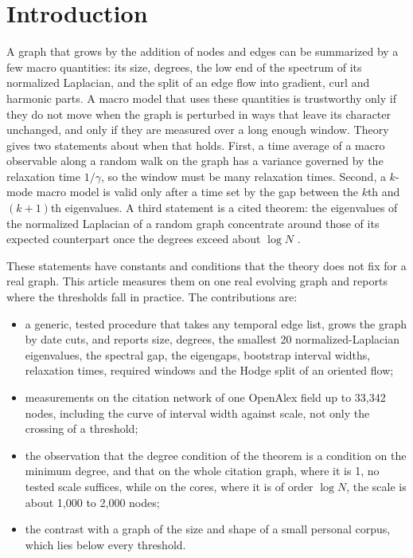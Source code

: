 \documentclass[11pt]{article}
\begin{document}
\section{Introduction}
A graph that grows by the addition of nodes and edges can be summarized by a few macro quantities:
its size, degrees, the low end of the spectrum of its normalized Laplacian, and the split of an edge
flow into gradient, curl and harmonic parts. A macro model that uses these quantities is trustworthy
only if they do not move when the graph is perturbed in ways that leave its character unchanged, and
only if they are measured over a long enough window. Theory gives two statements about when that
holds. First, a time average of a macro observable along a random walk on the graph has a variance
governed by the relaxation time $1/\gamma$, so the window must be many relaxation times. Second, a
$k$-mode macro model is valid only after a time set by the gap between the $k$th and $(k{+}1)$th
eigenvalues. A third statement is a cited theorem: the eigenvalues of the normalized Laplacian of a
random graph concentrate around those of its expected counterpart once the degrees exceed about
$\log N$ \citep{oliveira2009,chungradcliffe2011}.

These statements have constants and conditions that the theory does not fix for a real graph. This
article measures them on one real evolving graph and reports where the thresholds fall in practice.
The contributions are:
\begin{itemize}
  \item a generic, tested procedure that takes any temporal edge list, grows the graph by date cuts,
  and reports size, degrees, the smallest 20 normalized-Laplacian eigenvalues, the spectral gap, the
  eigengaps, bootstrap interval widths, relaxation times, required windows and the Hodge split of
  an oriented flow;
  \item measurements on the citation network of one OpenAlex field up to 33,342 nodes, including the
  curve of interval width against scale, not only the crossing of a threshold;
  \item the observation that the degree condition of the theorem is a condition on the minimum
  degree, and that on the whole citation graph, where it is 1, no tested scale suffices, while on the
  cores, where it is of order $\log N$, the scale is about 1,000 to 2,000 nodes;
  \item the contrast with a graph of the size and shape of a small personal corpus, which lies
  below every threshold.
\end{itemize}
\end{document}
